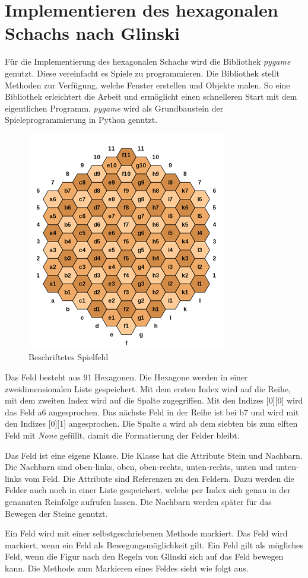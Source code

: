 \newcommand{\code}[1]{\texttt{#1}}

\chapter{Implementieren des hexagonalen Schachs nach Glinski}
Für die Implementierung des hexagonalen Schachs wird die Bibliothek \textit{pygame} genutzt. Diese vereinfacht es Spiele zu programmieren. Die Bibliothek stellt Methoden zur Verfügung, welche Fenster erstellen und Objekte malen. So eine Bibliothek erleichtert die Arbeit und ermöglicht einen schnelleren Start mit dem eigentlichen Programm. \textit{pygame} wird als Grundbaustein der Spieleprogrammierung in Python genutzt.

\begin{figure}[H]
    \centering
    \includegraphics{images/hexIndex.png}
    \caption{Beschriftetes Spielfeld \protect\footnotemark}
    \label{fig:hex:index}
\end{figure}

Das Feld besteht aus 91 Hexagonen. Die Hexagone werden in einer zweidimensionalen Liste gespeichert. Mit dem ersten Index wird auf die Reihe, mit dem zweiten Index wird auf die Spalte zugegriffen. Mit den Indizes [0][0] wird das Feld  a6 angesprochen. Das nächste Feld in der Reihe ist bei b7 und wird mit den Indizes [0][1] angesprochen. Die Spalte a wird ab dem siebten bis zum elften Feld mit \textit{None} gefüllt, damit die Formatierung der Felder bleibt.\par
Das Feld ist eine eigene Klasse. Die Klasse hat die Attribute Stein und Nachbarn. Die Nachbarn sind oben-links, oben, oben-rechts, unten-rechts, unten und unten-links vom Feld. Die Attribute sind Referenzen zu den Feldern. Dazu werden die Felder auch noch in einer Liste gespeichert, welche per Index sich genau in der genannten Reinfolge aufrufen lassen. Die Nachbarn werden später für das Bewegen der Steine genutzt.\par
Ein Feld wird mit einer selbstgeschriebenen Methode markiert. Das Feld wird markiert, wenn ein Feld als Bewegungsmöglichkeit gilt. Ein Feld gilt als mögliches Feld, wenn die Figur nach den Regeln von Glinski sich auf das Feld bewegen kann. Die Methode zum Markieren eines Feldes sieht wie folgt aus.

